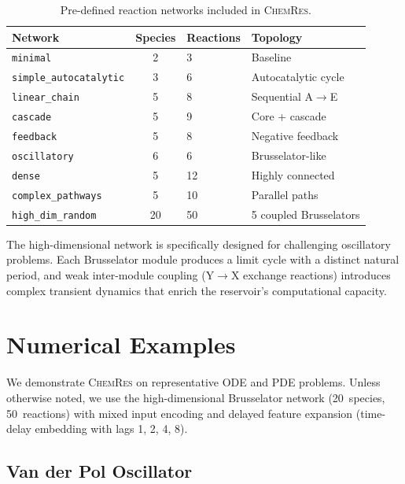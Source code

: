 \documentclass[11pt,twocolumn]{article}
\newcommand{\software}{\textsc{ChemRes}}
\begin{document}
\begin{table}[t]
\centering
\caption{Pre-defined reaction networks included in \software{}.}
\label{tab:networks}
\small
\begin{tabular}{@{}lcll@{}}
\hline
Network & Species & Reactions & Topology \\
\hline
\texttt{minimal}           & 2  & 3  & Baseline \\
\texttt{simple\_autocatalytic} & 3  & 6  & Autocatalytic cycle \\
\texttt{linear\_chain}     & 5  & 8  & Sequential A$\to$E \\
\texttt{cascade}           & 5  & 9  & Core + cascade \\
\texttt{feedback}          & 5  & 8  & Negative feedback \\
\texttt{oscillatory}       & 6  & 6  & Brusselator-like \\
\texttt{dense}             & 5  & 12 & Highly connected \\
\texttt{complex\_pathways} & 5  & 10 & Parallel paths \\
\texttt{high\_dim\_random} & 20 & 50 & 5 coupled Brusselators \\
\hline
\end{tabular}
\end{table}

The high-dimensional network is specifically designed for challenging
oscillatory problems.  Each Brusselator module produces a limit cycle with a
distinct natural period, and weak inter-module coupling (Y$\to$X exchange
reactions) introduces complex transient dynamics that enrich the reservoir's
computational capacity.

\section{Numerical Examples}
\label{sec:examples}

We demonstrate \software{} on representative ODE and PDE problems.  Unless
otherwise noted, we use the high-dimensional Brusselator network (20~species,
50~reactions) with mixed input encoding and delayed feature expansion
(time-delay embedding with lags 1, 2, 4, 8).

\subsection{Van der Pol Oscillator}
\label{sec:vanderpol}
\end{document}
